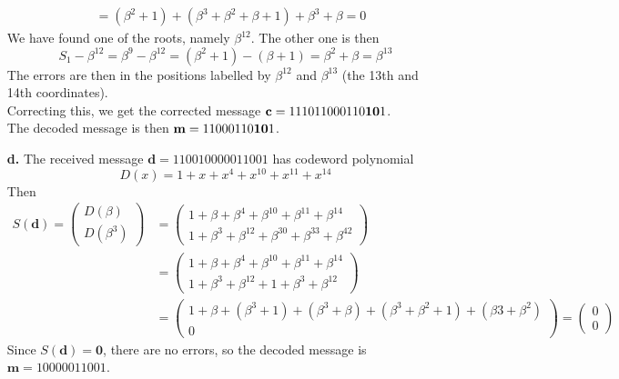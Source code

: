 \documentclass[11pt]{article}
\renewcommand{\vec}[1]{\mathbf{#1}}
\newcommand{\vc}[1]{\begin{pmatrix}#1\end{pmatrix}}
\begin{document}
\begin{itemize}
\begin{align*}
                     &= (\beta^2+1) + (\beta^3+\beta^2+\beta+1) + \beta^3 + \beta
                      =  0
                    \end{align*}
                   We have found one of the roots, namely $\beta^{12}$.
                   The other one is then
                   \[
                     S_1 - \beta^{12} = \beta^9-\beta^{12}
                                      = (\beta^2+1) - (\beta+1)
                                      = \beta^2+\beta
                                      = \beta^{13}
                   \]
                   The errors are then in the positions labelled by $\beta^{12}$ and $\beta^{13}$
                   (the 13th and 14th coordinates).\\
                   Correcting this, we get the corrected message
                   $\vec{c} = \text{111011000110\textbf{10}1}$.\\
                   The decoded message is then $\vec{m} = \text{11000110\textbf{10}1}$.
      \item[{\bf d.}] The received message     $\vec{d} = \text{110010000011001}$
                   has codeword polynomial
                   \[
                     D(x) = 1 + x + x^4 + x^{10} + x^{11} + x^{14}
                   \]
                   Then
                   \begin{align*}
                     S(\vec{d}) = \vc{D(\beta)\\
                                      D(\beta^3)}
                               &= \vc{1 + \beta   + \beta^4    + \beta^{10} + \beta^{11} + \beta^{14} \\
                                      1 + \beta^3 + \beta^{12} + \beta^{30} + \beta^{33} + \beta^{42}}\\
                               &= \vc{1 + \beta   + \beta^4    + \beta^{10} + \beta^{11} + \beta^{14} \\
                                      1 + \beta^3 + \beta^{12} +      1     + \beta^3    + \beta^{12}}\\
                               &= \vc{1 + \beta   + (\beta^3+1)+(\beta^3+\beta) + (\beta^3+\beta^2+1) + (\beta3+\beta^2) \\
                                      0}
                                = \vc{0\\
                                      0}
                   \end{align*}
                   Since $S(\vec{d}) = \vec{0}$, there are no errors,
                   so the decoded message is $\vec{m} = \text{10000011001}$.
\end{itemize}
\end{document}
